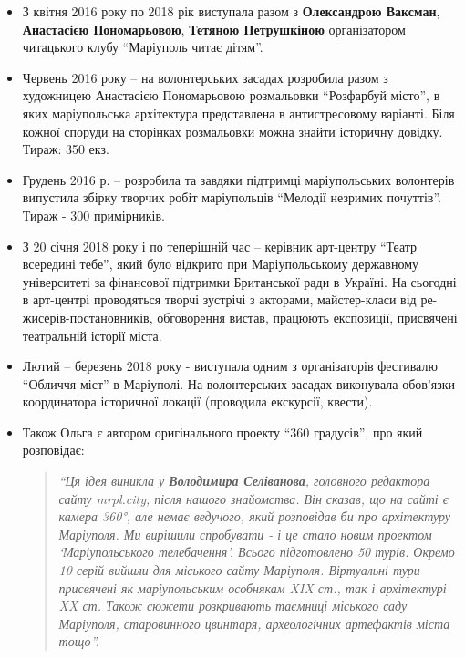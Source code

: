 \begin{itemize} %
\item З квітня 2016 року по 2018 рік виступала разом з \textbf{Олександрою Ваксман},
\textbf{Анастасією Пономарьовою}, \textbf{Тетяною Петрушкіною} організатором читацького клубу
\enquote{Маріуполь читає дітям}.

\item Червень 2016 року – на волонтерських засадах розробила разом з художницею
Анастасією Пономарьовою розмальовки \enquote{Розфарбуй місто}, в яких
маріупольська архітектура представлена в антистресовому
варіанті. Біля кожної споруди на сторінках розмальовки можна
знайти історичну довідку. Тираж: 350 екз.

\item Грудень 2016 р. – розробила та завдяки підтримці маріупольських волонтерів
випустила збірку творчих робіт маріупольців \enquote{Мелодії незримих почуттів}. Тираж
- 300 примірників.

\item З 20 січня 2018 року і по теперішній час – керівник арт-центру \enquote{Театр всередині
тебе}, який було відкрито при Маріупольському державному університеті за
фінансової підтримки Британської ради в Україні. На сьогодні в арт-центрі
проводяться творчі зустрічі з акторами, майстер-класи від
ре\hyp{}жисерів-постановників, обговорення вистав, працюють експозиції, присвячені
театральній історії міста.

\item Лютий – березень 2018 року - виступала одним з організаторів фестивалю
\enquote{Обличчя міст} в Маріуполі. На волонтерських засадах виконувала
обов'язки координатора історичної локації (проводила екскурсії,
квести).

\item Також Ольга є автором оригінального проекту \enquote{360 градусів},	 про який
розповідає: 

\begin{quote}
\em\enquote{Ця ідея виникла у \textbf{Володимира Селіванова}, головного
редактора сайту mrpl.city, після нашого знайомства. Він сказав,
що на сайті є камера 360°, але немає ведучого, який розповідав
би про архітектуру Маріуполя. Ми вирішили спробувати - і це
стало новим проектом \enquote{Маріупольського телебачення}. Всього
підготовлено 50 турів. Окремо 10 серій вийшли для міського
сайту Маріуполя. Віртуальні тури присвячені як маріупольським
особнякам XIX ст., так і архітектурі XX ст. Також сюжети
розкривають таємниці міського саду Маріуполя, старовинного
цвинтаря, археологічних артефактів міста тощо}.
\end{quote}

\end{itemize} %


